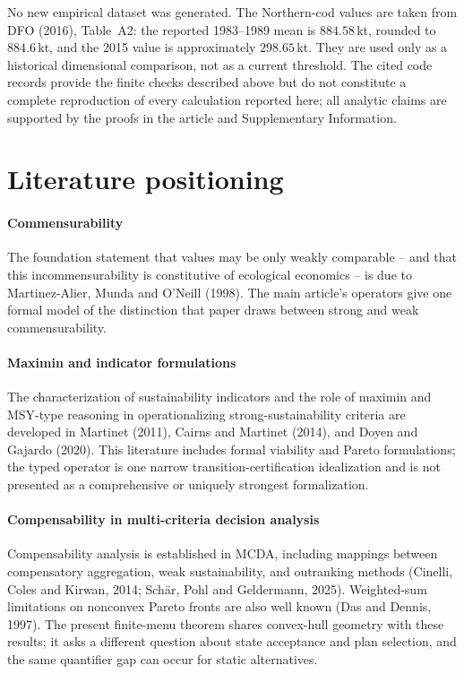 No new empirical dataset was generated. The Northern-cod values are taken from DFO (2016), Table~A2: the reported 1983--1989 mean is $884.58$\,kt, rounded to $884.6$\,kt, and the 2015 value is approximately $298.65$\,kt. They are used only as a historical dimensional comparison, not as a current threshold. The cited code records provide the finite checks described above but do not constitute a complete reproduction of every calculation reported here; all analytic claims are supported by the proofs in the article and Supplementary Information.

\section{Literature positioning}\label{si:positioning}

\paragraph{Commensurability} The foundation statement that values may be only weakly comparable -- and that this incommensurability is constitutive of ecological economics -- is due to Martinez-Alier, Munda and O'Neill (1998). The main article's operators give one formal model of the distinction that paper draws between strong and weak commensurability.

\paragraph{Maximin and indicator formulations} The characterization of sustainability indicators and the role of maximin and MSY-type reasoning in operationalizing strong-sustainability criteria are developed in Martinet (2011), Cairns and Martinet (2014), and Doyen and Gajardo (2020). This literature includes formal viability and Pareto formulations; the typed operator is one narrow transition-certification idealization and is not presented as a comprehensive or uniquely strongest formalization.

\paragraph{Compensability in multi-criteria decision analysis} Compensability analysis is established in MCDA, including mappings between compensatory aggregation, weak sustainability, and outranking methods (Cinelli, Coles and Kirwan, 2014; Sch\"ar, Pohl and Geldermann, 2025). Weighted-sum limitations on nonconvex Pareto fronts are also well known (Das and Dennis, 1997). The present finite-menu theorem shares convex-hull geometry with these results; it asks a different question about state acceptance and plan selection, and the same quantifier gap can occur for static alternatives.

